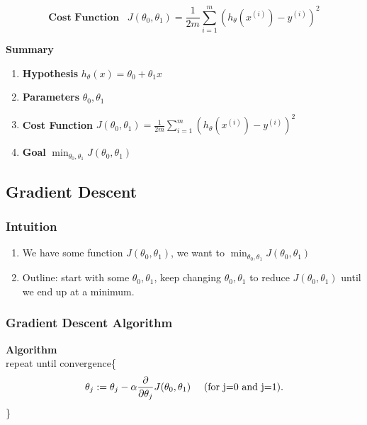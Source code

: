       \begin{equation} 
          \boxed{ 
              \textbf{Cost Function}\hspace{10pt} J(\theta_0, \theta_1) = \frac{1}{2m} \sum_{i=1}^{m} (h_\theta(x^{(i)}) - y^{(i)} )^2
      }
          \label{eq:cost}
      \end{equation}
      

      \par \textbf{Summary} 
      \begin{enumerate}
          \item \textbf{Hypothesis  }$h_\theta (x) = \theta_0 + \theta_1x$
          \item \textbf{Parameters } $\theta_0, \theta_1$
          \item \textbf{Cost Function }$J(\theta_0, \theta_1) = \frac{1}{2m} \sum_{i=1}^{m} (h_\theta(x^{(i)}) - y^{(i)} )^2$
          \item \textbf{Goal } $\min_{\theta_0, \theta_1} J(\theta_0, \theta_1)$
    
      \end{enumerate}
        

          
   
    
    \subsection{Gradient Descent}
        \subsubsection{Intuition}
            \begin{enumerate}
                \item We have some function $J(\theta_0, \theta_1)$, we want to $\min_{\theta_0, \theta_1} J (\theta_0, \theta_1)$
                \item Outline: start with some $\theta_0, \theta_1$, keep changing  $\theta_0, \theta_1$ to reduce $J(\theta_0, \theta_1)$ until we end up at a minimum. 
            \end{enumerate}
        \subsubsection{Gradient Descent Algorithm}
            \textbf{Algorithm} \\

                repeat until convergence\{  
                    \[ \theta_j := \theta_j - \alpha \frac{\partial }{\partial \theta_j} J(\theta_0, \theta_1)\mbox{\hspace{10pt} (for j=0 and j=1)} 
                   .\] \}
        \\


